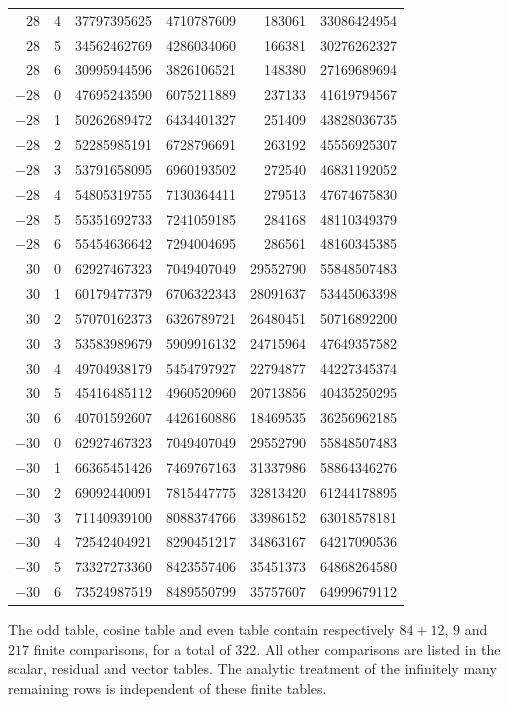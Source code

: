 {\begin{longtable}{rrrrrr}
$28$ & 4 & 37797395625 & 4710787609 & 183061 & 33086424954\\
$28$ & 5 & 34562462769 & 4286034060 & 166381 & 30276262327\\
$28$ & 6 & 30995944596 & 3826106521 & 148380 & 27169689694\\
$-28$ & 0 & 47695243590 & 6075211889 & 237133 & 41619794567\\
$-28$ & 1 & 50262689472 & 6434401327 & 251409 & 43828036735\\
$-28$ & 2 & 52285985191 & 6728796691 & 263192 & 45556925307\\
$-28$ & 3 & 53791658095 & 6960193502 & 272540 & 46831192052\\
$-28$ & 4 & 54805319755 & 7130364411 & 279513 & 47674675830\\
$-28$ & 5 & 55351692733 & 7241059185 & 284168 & 48110349379\\
$-28$ & 6 & 55454636642 & 7294004695 & 286561 & 48160345385\\
$30$ & 0 & 62927467323 & 7049407049 & 29552790 & 55848507483\\
$30$ & 1 & 60179477379 & 6706322343 & 28091637 & 53445063398\\
$30$ & 2 & 57070162373 & 6326789721 & 26480451 & 50716892200\\
$30$ & 3 & 53583989679 & 5909916132 & 24715964 & 47649357582\\
$30$ & 4 & 49704938179 & 5454797927 & 22794877 & 44227345374\\
$30$ & 5 & 45416485112 & 4960520960 & 20713856 & 40435250295\\
$30$ & 6 & 40701592607 & 4426160886 & 18469535 & 36256962185\\
$-30$ & 0 & 62927467323 & 7049407049 & 29552790 & 55848507483\\
$-30$ & 1 & 66365451426 & 7469767163 & 31337986 & 58864346276\\
$-30$ & 2 & 69092440091 & 7815447775 & 32813420 & 61244178895\\
$-30$ & 3 & 71140939100 & 8088374766 & 33986152 & 63018578181\\
$-30$ & 4 & 72542404921 & 8290451217 & 34863167 & 64217090536\\
$-30$ & 5 & 73327273360 & 8423557406 & 35451373 & 64868264580\\
$-30$ & 6 & 73524987519 & 8489550799 & 35757607 & 64999679112\\
\end{longtable}
}

The odd table, cosine table and even table contain respectively $84+12$, $9$
and $217$ finite comparisons, for a total of $322$. All other comparisons are
listed in the scalar, residual and vector tables. The analytic treatment of
the infinitely many remaining rows is independent of these finite tables.
